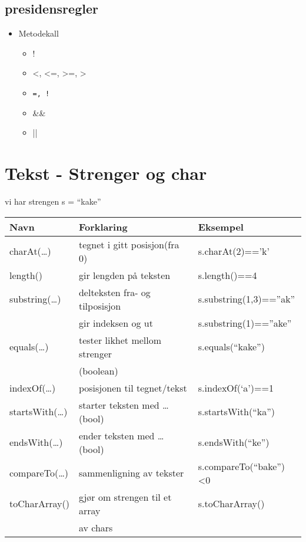 \documentclass[a4paper,norsk,10pt]{article}
\begin{document}
\subsection{presidensregler}
\label{sec-2.1}


\begin{itemize}
\item Metodekall

\begin{itemize}
\item !
\item <, <=, >=, >
\item \texttt{=, !}
\item \&\&
\item ||
\end{itemize}

\end{itemize}
\section{Tekst - Strenger og char}
\label{sec-3}


  vi har strengen s = ``kake''
  

\begin{center}
\begin{tabular}{lll}
\hline
 Navn                  &  Forklaring                           &  Eksempel                  \\
\hline
 charAt(\ldots{})      &  tegnet i gitt posisjon(fra 0)        &  s.charAt(2)=='k'          \\
\hline
 length()              &  gir lengden på teksten               &  s.length()==4             \\
\hline
 substring(\ldots{})   &  delteksten fra- og tilposisjon       &  s.substring(1,3)==''ak''  \\
                       &  gir indeksen og ut                   &  s.substring(1)==''ake''   \\
\hline
 equals(\ldots{})      &  tester likhet mellom strenger        &  s.equals(``kake'')        \\
                       &  (boolean)                            &                            \\
\hline
 indexOf(\ldots{})     &  posisjonen til tegnet/tekst          &  s.indexOf(`a')==1         \\
\hline
 startsWith(\ldots{})  &  starter teksten med \ldots{} (bool)  &  s.startsWith(``ka'')      \\
\hline
 endsWith(\ldots{})    &  ender teksten med \ldots{} (bool)    &  s.endsWith(``ke'')        \\
\hline
 compareTo(\ldots{})   &  sammenligning av tekster             &  s.compareTo(``bake'')<0   \\
\hline
 toCharArray()         &  gjør om strengen til et array        &  s.toCharArray()           \\
                       &  av chars                             &                            \\
\hline
\end{tabular}
\end{center}
\end{document}
